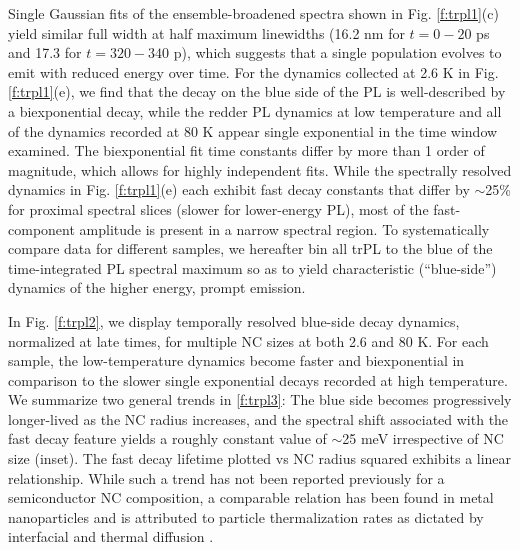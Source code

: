 Single Gaussian fits of the ensemble-broadened spectra shown in Fig. \ref{f:trpl1}(c) yield similar full width at half maximum linewidths (16.2 nm for $t = 0 - 20$ ps and 17.3 for $t = 320 - 340$ p), which suggests that a single population evolves to emit with reduced energy over time. For the dynamics collected at 2.6 K in Fig. \ref{f:trpl1}(e), we find that the decay on the blue side of the PL is well-described by a biexponential decay, while the redder PL dynamics at low temperature and all of the dynamics recorded at 80 K appear single exponential in the time window examined. The biexponential fit time constants differ by more than 1 order of magnitude, which allows for highly independent fits. While the spectrally resolved dynamics in Fig. \ref{f:trpl1}(e) each exhibit fast decay constants that differ by $\sim$25\% for proximal spectral slices (slower for lower-energy PL), most of the fast-component amplitude is present in a narrow spectral region. To systematically compare data for different samples, we hereafter bin all trPL to the blue of the time-integrated PL spectral maximum so as to yield characteristic (“blue-side”) dynamics of the higher energy, prompt emission. \par

In Fig. \ref{f:trpl2}, we display temporally resolved blue-side decay dynamics, normalized at late times, for multiple NC sizes at both 2.6 and 80 K. For each sample, the low-temperature dynamics become faster and biexponential in comparison to the slower single exponential decays recorded at high temperature. We summarize two general trends in \ref{f:trpl3}: The blue side becomes progressively longer-lived as the NC radius increases, and the spectral shift associated with the fast decay feature yields a roughly constant value of $\sim$25 meV irrespective of NC size (inset).  The fast decay lifetime plotted vs NC radius squared exhibits a linear relationship. While such a trend has not been reported previously for a semiconductor NC composition, a comparable relation has been found in metal nanoparticles \cite{doi:10.1021/jp020581+, PhysRevB.66.224301} and is attributed to particle thermalization rates as dictated by interfacial and thermal diffusion \cite{doi:10.1021/jp020581+, PhysRevB.66.224301,doi:10.1021/jp048375k}. \par

